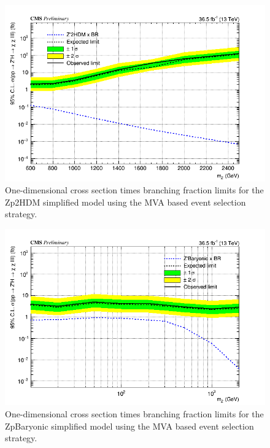 \begin{figure}[tbh]
\centering
\includegraphics[width=5in]{figures/sigma_limits_4mu_Zp2HDM.png}
\caption{One-dimensional cross section times branching fraction limits for the Zp2HDM simplified model using the MVA based event selection strategy.}
\label{fig:limzp2hdmmva}
\end{figure}

\begin{figure}[tbh]
\centering
\includegraphics[width=5in]{figures/sigma_limits_4mu_ZpBaryonic.png}
\caption{One-dimensional cross section times branching fraction limits for the ZpBaryonic simplified model using the MVA based event selection strategy.}
\label{fig:limzpbaryonicmva}
\end{figure}

